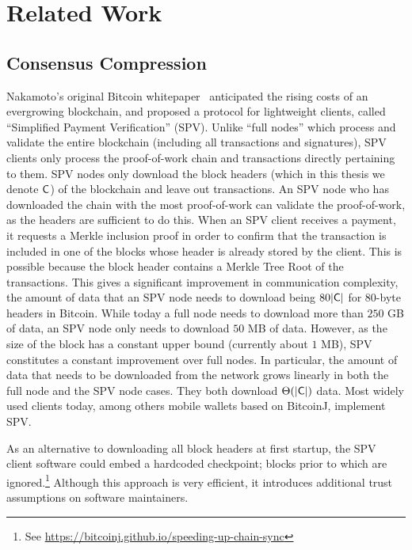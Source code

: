 \section{Related Work}

\subsection{Consensus Compression}
Nakamoto's original Bitcoin whitepaper~\cite{bitcoin} anticipated the rising
costs of an evergrowing blockchain, and proposed a protocol for lightweight
clients, called ``Simplified Payment Verification'' (SPV). Unlike ``full nodes''
which process and validate the entire blockchain (including all transactions and
signatures), SPV clients only process the proof-of-work chain and transactions
directly pertaining to them. SPV nodes only download the block headers (which in
this thesis we denote $\mathsf{C}$) of the blockchain and leave out transactions. An
SPV node who has downloaded the chain with the most proof-of-work can validate
the proof-of-work, as the headers are sufficient to do this.
When an SPV client receives a
payment, it requests a Merkle inclusion proof in
order to confirm that the transaction is included in one of the blocks whose
header is already stored by the client. This is possible because the block
header contains a Merkle Tree Root of the transactions.
This gives a significant improvement in communication
complexity, the amount of data that an SPV node needs to download being
$80|\mathsf{C}|$ for $80$-byte headers in Bitcoin. While today a full node needs to
download more than $250$ GB of data, an SPV node only needs to download $50$ MB
of data. However, as the size of the block has a constant upper bound (currently
about $1$ MB), SPV constitutes a constant improvement over full nodes. In
particular, the amount of data that needs to be downloaded from the network
grows linearly in both the full node and the SPV node cases. They both download
$\Theta(|\mathsf{C}|)$ data.
Most widely used clients today, among others
mobile wallets based on BitcoinJ, implement SPV.

As an alternative to downloading all block headers at first startup, the SPV
client software could embed a hardcoded checkpoint; blocks prior to which are
ignored.\footnote{See \url{https://bitcoinj.github.io/speeding-up-chain-sync}}
Although this approach is very efficient, it introduces
additional trust assumptions on software maintainers.

